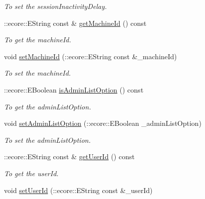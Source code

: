\begin{DoxyCompactItemize}
\begin{DoxyCompactList}\small\item\em To set the sessionInactivityDelay. \item\end{DoxyCompactList}\item 
::ecore::EString const \& \hyperlink{classUMS__Data_1_1ListSessionOptions_a18d789a6091bb9f15194f8ef8e9b51d8}{getMachineId} () const 
\begin{DoxyCompactList}\small\item\em To get the machineId. \item\end{DoxyCompactList}\item 
void \hyperlink{classUMS__Data_1_1ListSessionOptions_a047eb906175f7369ac557914c3e927f2}{setMachineId} (::ecore::EString const \&\_\-machineId)
\begin{DoxyCompactList}\small\item\em To set the machineId. \item\end{DoxyCompactList}\item 
::ecore::EBoolean \hyperlink{classUMS__Data_1_1ListSessionOptions_a7792cadeeb37b941586eba8c5ab3dc15}{isAdminListOption} () const 
\begin{DoxyCompactList}\small\item\em To get the adminListOption. \item\end{DoxyCompactList}\item 
void \hyperlink{classUMS__Data_1_1ListSessionOptions_a8c0e06b683ce5c0a56b12f4c20b2e693}{setAdminListOption} (::ecore::EBoolean \_\-adminListOption)
\begin{DoxyCompactList}\small\item\em To set the adminListOption. \item\end{DoxyCompactList}\item 
::ecore::EString const \& \hyperlink{classUMS__Data_1_1ListSessionOptions_ac08c896ab35b6ea65c8764f37eb55dfc}{getUserId} () const 
\begin{DoxyCompactList}\small\item\em To get the userId. \item\end{DoxyCompactList}\item 
void \hyperlink{classUMS__Data_1_1ListSessionOptions_a66486e0af939c5f2da8ec35101ab9262}{setUserId} (::ecore::EString const \&\_\-userId)

\end{DoxyCompactItemize}

